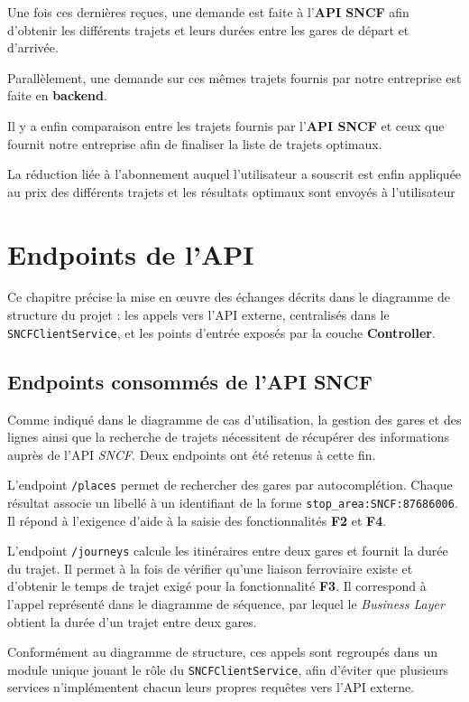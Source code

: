 \documentclass[12pt,a4paper]{report}
\begin{document}
Une fois ces dernières reçues, une demande est faite à l'\textbf{API SNCF} afin d'obtenir les différents trajets et leurs durées entre les gares de départ et d'arrivée.

Parallèlement, une demande sur ces mêmes trajets fournis par notre entreprise est faite en \textbf{backend}.

Il y a enfin comparaison entre les trajets fournis par l'\textbf{API SNCF} et ceux que fournit notre entreprise afin de finaliser la liste de trajets optimaux.

La réduction liée à l'abonnement auquel l'utilisateur a souscrit est enfin appliquée au prix des différents trajets et les résultats optimaux sont envoyés à l'utilisateur


\chapter{Endpoints de l'API}

Ce chapitre précise la mise en œuvre des échanges décrits dans le diagramme de
structure du projet : les appels vers l'API externe, centralisés dans le
\texttt{SNCFClientService}, et les points d'entrée exposés par la couche
\textbf{Controller}.

\section{Endpoints consommés de l'API SNCF}

Comme indiqué dans le diagramme de cas d'utilisation, la gestion des gares et
des lignes ainsi que la recherche de trajets nécessitent de récupérer des
informations auprès de l'API \textit{SNCF}. Deux endpoints ont été retenus à
cette fin.

L'endpoint \texttt{/places} permet de rechercher des gares par autocomplétion.
Chaque résultat associe un libellé à un identifiant de la forme
\texttt{stop\_area:SNCF:87686006}. Il répond à l'exigence d'aide à la saisie des
fonctionnalités \textbf{F2} et \textbf{F4}.

L'endpoint \texttt{/journeys} calcule les itinéraires entre deux gares et
fournit la durée du trajet. Il permet à la fois de vérifier qu'une liaison
ferroviaire existe et d'obtenir le temps de trajet exigé pour la fonctionnalité
\textbf{F3}. Il correspond à l'appel représenté dans le diagramme de séquence,
par lequel le \textit{Business Layer} obtient la durée d'un trajet entre deux
gares.

Conformément au diagramme de structure, ces appels sont regroupés dans un module
unique jouant le rôle du \texttt{SNCFClientService}, afin d'éviter que plusieurs
services n'implémentent chacun leurs propres requêtes vers l'API externe.
\end{document}
